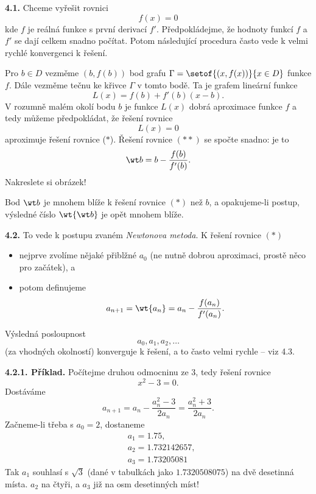 \documentclass[12pt]{article}
\begin{document}
{{ \bigskip
 
 {\bf 4.1.} Chceme vyřešit rovnici
 \begin{equation}
 f(x)=0 \tag{$*$}
 \end{equation}
 kde $f$ je reálná funkce s první derivací $f'$.  Předpokládejme, že hodnoty funkcí $f$ a  $f'$ se dají celkem snadno počítat. Potom následující procedura často vede k velmi rychlé konvergenci k řešení.
 
 \smallskip
 Pro  $b\in D$ vezměme $(b,f(b))$ bod grafu $\Gamma=\setof{(x,f(x))}{x\in D}$ funkce $f$. Dále vezměme tečnu ke křivce $\Gamma$ v tomto bodě. Ta je grafem lineární funkce
 $$
 L(x)=f(b)+f'(b)(x-b). 
 $$
V rozumně malém okolí bodu $b$ je funkce $L(x)$  dobrá aproximace funkce $f$ a tedy můžeme předpokládat, že
řešení rovnice
 \begin{equation}
 L(x)=0 \tag{$**$}
 \end{equation}
aproximuje řešení rovnice ($*$). Řešení rovnice $(**)$ se spočte snadno: je to
$$
\wt b=b-\frac{f(b)}{f'(b)}.
$$
Nakreslete si obrázek!


\bigskip

\noindent Bod $\wt b$ je mnohem blíže k řešení rovnice  $(*)$ než $b$, a opakujeme-li postup, výsledné číslo $\wt{\wt b}$ je opět mnohem blíže.

\bigskip

{\bf 4.2.} To vede k postupu zvaném {\em Newtonova metoda}.
K řešení rovnice $(*)$
\begin{itemize}
\item nejprve zvolíme nějaké přiblžné $a_0$ (ne nutně dobrou aproximaci, prostě něco pro začátek), a
\item potom definujeme
$$
a_{n+1}= \wt{a_n}=a_n-\frac{f(a_n)}{f'(a_n)}.
$$
\end{itemize}
Výsledná posloupnost
$$
a_0,a_1,a_2,\dots
$$
(za vhodných okolností) konverguje k řešení, a to často velmi rychle -- viz 4.3.

\medskip

{\bf 4.2.1. Příklad.} Počítejme druhou odmocninu ze 3, tedy řešení rovnice
$$
x^2-3=0.
$$
Dostáváme
$$
a_{n+1}=a_n-\frac{a_n^2-3}{2a_n}=\frac{a_n^2+3}{2a_n}.
$$
 Začneme-li třeba s $a_0=2$, dostaneme
$$
\begin{aligned}
&a_1=1.75,\\
&a_2=1.732142657,\\
&a_3=1.73205081
\end{aligned}
$$
Tak $a_1$ souhlasí s $\sqrt 3$ (dané v tabulkách jako $1.7320508075$) na dvě desetinná místa. $a_2$ na čtyři, a $a_3$ již na osm desetinných míst!

}}
\end{document}
